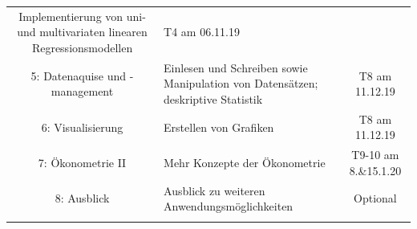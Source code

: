 \documentclass[]{tufte-book}
\begin{document}
\begin{longtable}[]{@{}clc@{}}
\begin{minipage}[t]{0.34\columnwidth}
Implementierung von uni- und multivariaten linearen
Regressionsmodellen\strut
\end{minipage} & \begin{minipage}[t]{0.34\columnwidth}\centering\strut
T4 am 06.11.19\strut
\end{minipage}\tabularnewline
\begin{minipage}[t]{0.24\columnwidth}\centering\strut
5: Datenaquise und -management\strut
\end{minipage} & \begin{minipage}[t]{0.34\columnwidth}\raggedright\strut
Einlesen und Schreiben sowie Manipulation von Datensätzen; deskriptive
Statistik\strut
\end{minipage} & \begin{minipage}[t]{0.34\columnwidth}\centering\strut
T8 am 11.12.19\strut
\end{minipage}\tabularnewline
\begin{minipage}[t]{0.24\columnwidth}\centering\strut
6: Visualisierung\strut
\end{minipage} & \begin{minipage}[t]{0.34\columnwidth}\raggedright\strut
Erstellen von Grafiken\strut
\end{minipage} & \begin{minipage}[t]{0.34\columnwidth}\centering\strut
T8 am 11.12.19\strut
\end{minipage}\tabularnewline
\begin{minipage}[t]{0.24\columnwidth}\centering\strut
7: Ökonometrie II\strut
\end{minipage} & \begin{minipage}[t]{0.34\columnwidth}\raggedright\strut
Mehr Konzepte der Ökonometrie\strut
\end{minipage} & \begin{minipage}[t]{0.34\columnwidth}\centering\strut
T9-10 am 8.\&15.1.20\strut
\end{minipage}\tabularnewline
\begin{minipage}[t]{0.24\columnwidth}\centering\strut
8: Ausblick\strut
\end{minipage} & \begin{minipage}[t]{0.34\columnwidth}\raggedright\strut
Ausblick zu weiteren Anwendungsmöglichkeiten\strut
\end{minipage} & \begin{minipage}[t]{0.34\columnwidth}\centering\strut
Optional\strut
\end{minipage}\tabularnewline
\begin{minipage}[t]{0.24\columnwidth}\centering\strut

\end{minipage}
\end{longtable}
\end{document}
